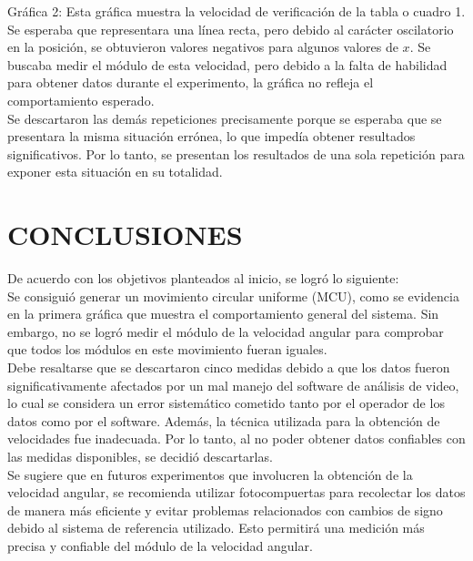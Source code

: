 \documentclass[journal]{IEEEtran}
\begin{document}
Gráfica 2: Esta gráfica muestra la velocidad de verificación de la tabla o cuadro 1. Se esperaba que representara una línea recta, pero debido al carácter oscilatorio en la posición, se obtuvieron valores negativos para algunos valores de $x$. Se buscaba medir el módulo de esta velocidad, pero debido a la falta de habilidad para obtener datos durante el experimento, la gráfica no refleja el comportamiento esperado.\\

Se descartaron las demás repeticiones precisamente porque se esperaba que se presentara la misma situación errónea, lo que impedía obtener resultados significativos. Por lo tanto, se presentan los resultados de una sola repetición para exponer esta situación en su totalidad.

\section{ CONCLUSIONES} 
De acuerdo con los objetivos planteados al inicio, se logró lo siguiente:\\

Se consiguió generar un movimiento circular uniforme (MCU), como se evidencia en la primera gráfica que muestra el comportamiento general del sistema. Sin embargo, no se logró medir el módulo de la velocidad angular para comprobar que todos los módulos en este movimiento fueran iguales.\\

Debe resaltarse que se descartaron cinco medidas debido a que los datos fueron significativamente afectados por un mal manejo del software de análisis de video, lo cual se considera un error sistemático cometido tanto por el operador de los datos como por el software. Además, la técnica utilizada para la obtención de velocidades fue inadecuada. Por lo tanto, al no poder obtener datos confiables con las medidas disponibles, se decidió descartarlas.\\

Se sugiere que en futuros experimentos que involucren la obtención de la velocidad angular, se recomienda utilizar fotocompuertas para recolectar los datos de manera más eficiente y evitar problemas relacionados con cambios de signo debido al sistema de referencia utilizado. Esto permitirá una medición más precisa y confiable del módulo de la velocidad angular.\\


\end{document}
